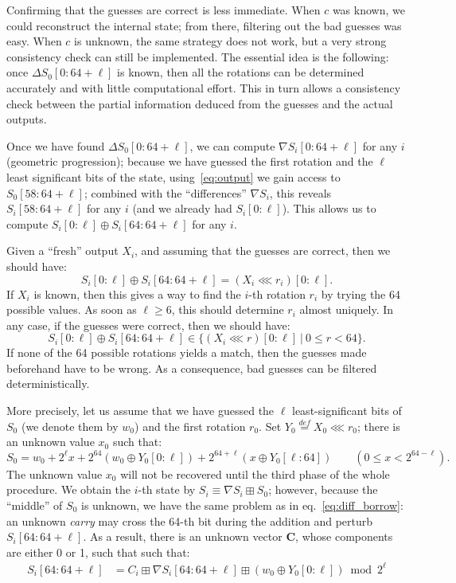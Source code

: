 \documentclass[submission,svgnames,journal=tosc]{iacrtrans}
\begin{document}
Confirming that the guesses are correct is less immediate. When $c$ was known,
we could reconstruct the internal state; from there, filtering out the bad
guesses was easy. When $c$ is unknown, the same strategy does not work, but a
very strong consistency check can still be implemented. The essential idea is
the following: once $\Delta S_0[0:64+\ell]$ is known, then all the rotations can
be determined accurately and with little computational effort. This in turn
allows a consistency check between the partial information deduced from the
guesses and the actual outputs.

Once we have found $\Delta S_0[0:64+\ell]$, we can compute
$\nabla S_i[0:64+\ell]$ for any $i$ (geometric progression); because we have
guessed the first rotation and the $\ell$ least significant bits of the state,
using~\eqref{eq:output} we gain access to $S_0[58:64+\ell]$; combined with the
``differences'' $\nabla S_i$, this reveals $S_i[58:64+\ell]$ for any $i$ (and we
already had $S_i[0:\ell]$). This allows us to compute
$S_i[0:\ell] \oplus S_i[64:64+\ell]$ for any $i$.

Given a ``fresh'' output $X_i$, and assuming that the guesses are correct, then we should have:
\begin{equation}\label{eq:find_rotation}
  S_i[0:\ell] \oplus S_i[64:64+\ell] = (X_i \lll r_i)[0:\ell].
\end{equation}
If $X_i$ is known, then this gives a way to find the $i$-th rotation $r_i$ by
trying the 64 possible values. As soon as $\ell \geq 6$, this should determine
$r_i$ almost uniquely. In any case, if the guesses were correct, then we should have:
\begin{equation}\label{eq:consistency}
  S_i[0:\ell] \oplus S_i[64:64+\ell] \in \bigl\{ (X_i \lll r)[0:\ell]~|~0 \leq r < 64 \bigr\}.
\end{equation}
If none of the 64 possible rotations yields a match, then the guesses made
beforehand have to be wrong. As a consequence, bad guesses can be filtered
deterministically.

More precisely, let us assume that we have guessed the $\ell$ least-significant
bits of $S_0$ (we denote them by $w_0$) and the first rotation $r_0$. Set
$Y_0 \stackrel{def}{=} X_0 \lll r_0$; there is an unknown value
$x_0$ such that:
\[
  S_0 = w_0 + 2^\ell x + 2^{64} (w_0 \oplus Y_0[0:\ell]) + 2^{64+\ell} (x \oplus Y_0[\ell:64]) \qquad \left(0 \leq x < 2^{64-\ell}\right).
\]
The unknown value $x_0$ will not be recovered until the third phase of the whole
procedure. We obtain the $i$-th state by $S_i \equiv \nabla S_i \boxplus S_0$;
however, because the ``middle'' of $S_0$ is unknown, we have the same problem as
in eq.~\eqref{eq:diff_borrow}: an unknown \emph{carry} may cross the 64-th bit
during the addition and perturb $S_i[64:64+\ell]$. As a result, there is an
unknown vector $\mathbf{C}$, whose components are either 0 or 1, such that such
that:
\begin{align*}
  S_i[64:64+\ell] &= C_i \boxplus \nabla S_i[64:64+\ell] \boxplus (w_0 \oplus Y_0[0:\ell]) \bmod 2^\ell \\
\end{align*}
\end{document}
